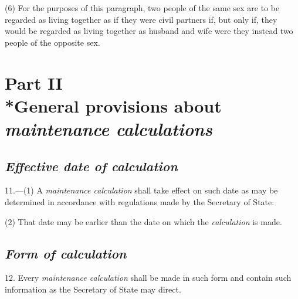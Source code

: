 \documentclass[12pt,a4paper]{article}
\begin{document}
(6) For the purposes of this paragraph, two people of the same sex are to be regarded as living together as if they were civil partners if, but only if, they would be regarded as living together as husband and wife were they instead two people of the opposite sex.


\section[Part II --- General provisions about 
\emph{maintenance calculations}  %
]{Part II\\*General provisions about 
\emph{maintenance calculations}  %
}

\renewcommand\parthead{--- Schedule 1 Part II}

\subsection*{\itshape Effective date of 
\emph{calculation}  %
}

11.---(1) A 
\emph{maintenance calculation}  %
shall take effect on such date as may be determined in accordance with regulations made by the Secretary of State.

(2) That date may be earlier than the date on which the 
\emph{calculation}  %
is made.


\subsection*{\itshape Form of 
\emph{calculation}  %
}

12. Every 
\emph{maintenance calculation}  %
shall be made in such form and contain such information as the 
Secretary of State  %
may direct.
\end{document}
